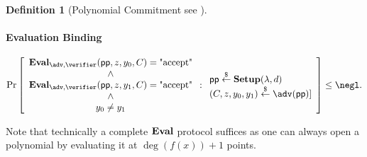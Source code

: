 \documentclass{article}
\newtheorem{definition}{Definition}
\begin{document}
\begin{definition}[Polynomial Commitment see \cite{AC:KatZavGol10} ]
\paragraph{Evaluation Binding}
	\[        
                \Pr\left[\begin{array}{c}\eval_{\adv,\verifier}(\crs,z,y_0,C)=\text{"accept"}\\
                \wedge\\
                \eval_{\adv,\verifier}(\crs,z,y_1,C)=\text{"accept"}\\
                \wedge\\
                y_0\neq y_1\end{array}  : 
                \begin{array}{l} 
                      \crs \sample \setup(\lambda, d) \\
                      (C,z,y_0,y_1)\sample \adv(\crs)]
                \end{array} 
        \right] \leq \negl.
\]
\end{definition}
Note that technically a complete $\textbf{{Eval}}$ protocol suffices as one can always open a polynomial by evaluating it at $\deg(f(x))+1$ points.
\end{document}
